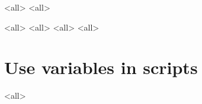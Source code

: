 \mode<all>{}
\mode<all>{}

\mode<all>{}
\mode<all>{}
\mode<all>{}
\mode<all>{}




\section{Use variables in scripts}

\mode<all>{}



